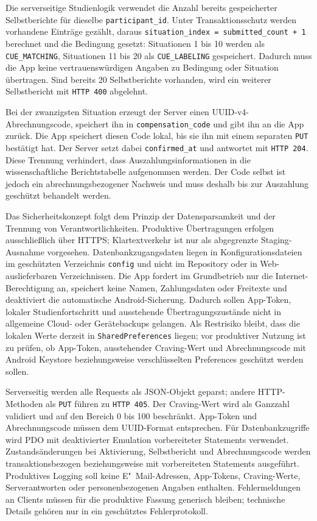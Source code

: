 Die serverseitige Studienlogik verwendet die Anzahl bereits gespeicherter Selbstberichte für dieselbe \texttt{participant\_id}. Unter Transaktionsschutz werden vorhandene Einträge gezählt, daraus \texttt{situation\_index = submitted\_count + 1} berechnet und die Bedingung gesetzt: Situationen 1 bis 10 werden als \texttt{CUE\_MATCHING}, Situationen 11 bis 20 als \texttt{CUE\_LABELING} gespeichert. Dadurch muss die App keine vertrauenswürdigen Angaben zu Bedingung oder Situation übertragen. Sind bereits 20 Selbstberichte vorhanden, wird ein weiterer Selbstbericht mit \texttt{HTTP 400} abgelehnt.

Bei der zwanzigsten Situation erzeugt der Server einen UUID-v4-Abrechnungscode, speichert ihn in \texttt{compensation\_code} und gibt ihn an die App zurück. Die App speichert diesen Code lokal, bis sie ihn mit einem separaten \texttt{PUT} bestätigt hat. Der Server setzt dabei \texttt{confirmed\_at} und antwortet mit \texttt{HTTP 204}. Diese Trennung verhindert, dass Auszahlungsinformationen in die wissenschaftliche Berichtstabelle aufgenommen werden. Der Code selbst ist jedoch ein abrechnungsbezogener Nachweis und muss deshalb bis zur Auszahlung geschützt behandelt werden.

Das Sicherheitskonzept folgt dem Prinzip der Datensparsamkeit und der Trennung von Verantwortlichkeiten. Produktive Übertragungen erfolgen ausschließlich über HTTPS; Klartextverkehr ist nur als abgegrenzte Staging-Ausnahme vorgesehen. Datenbankzugangsdaten liegen in Konfigurationsdateien im geschützten Verzeichnis \texttt{config} und nicht im Repository oder in Web-auslieferbaren Verzeichnissen. Die App fordert im Grundbetrieb nur die Internet-Berechtigung an, speichert keine Namen, Zahlungsdaten oder Freitexte und deaktiviert die automatische Android-Sicherung. Dadurch sollen App-Token, lokaler Studienfortschritt und ausstehende Übertragungszustände nicht in allgemeine Cloud- oder Gerätebackups gelangen. Als Restrisiko bleibt, dass die lokalen Werte derzeit in \texttt{SharedPreferences} liegen; vor produktiver Nutzung ist zu prüfen, ob App-Token, ausstehender Craving-Wert und Abrechnungscode mit Android Keystore beziehungsweise verschlüsselten Preferences geschützt werden sollen.

Serverseitig werden alle Requests als JSON-Objekt geparst; andere HTTP-Methoden als \texttt{PUT} führen zu \texttt{HTTP 405}. Der Craving-Wert wird als Ganzzahl validiert und auf den Bereich 0 bis 100 beschränkt. App-Token und Abrechnungscode müssen dem UUID-Format entsprechen. Für Datenbankzugriffe wird PDO mit deaktivierter Emulation vorbereiteter Statements verwendet. Zustandsänderungen bei Aktivierung, Selbstbericht und Abrechnungscode werden transaktionsbezogen beziehungsweise mit vorbereiteten Statements ausgeführt. Produktives Logging soll keine E"~Mail-Adressen, App-Tokens, Craving-Werte, Serverantworten oder personenbezogenen Angaben enthalten. Fehlermeldungen an Clients müssen für die produktive Fassung generisch bleiben; technische Details gehören nur in ein geschütztes Fehlerprotokoll.

